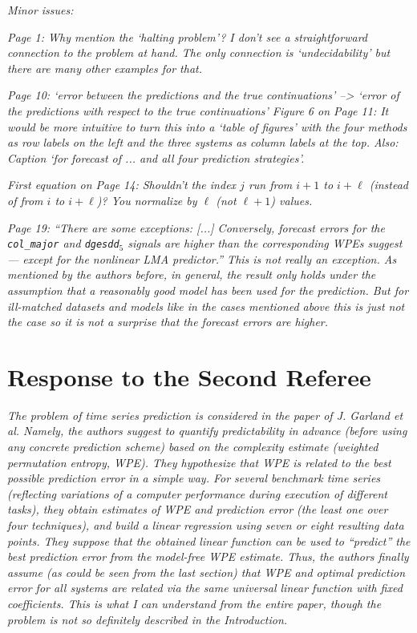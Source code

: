 \documentclass[12pt]{article}
\begin{document}
\noindent\emph{Minor issues:}

\emph{Page 1: Why mention the `halting problem'? I don't see a straightforward
connection to the problem at hand. The only connection is `undecidability' but
there are many other examples for that.}

\emph{Page 10: `error between the predictions and the true continuations' -->
`error of the predictions with respect to the true continuations' Figure 6 on
Page 11: It would be more intuitive to turn this into a `table of figures'
with the four methods as row labels on the left and the three systems as column
labels at the top. Also: Caption `for forecast of ... and all four prediction
strategies'.}

\emph{First equation on Page 14: Shouldn't the index $j$ run from $i+1$ to
$i+\ell$ (instead of from $i$ to $i+\ell$)? You normalize by $\ell$ (not
$\ell+1$) values.}

\emph{Page 19: ``There are some exceptions: [...] Conversely, forecast errors
for the \texttt{col\_major} and \texttt{dgesdd$_5$} signals are higher than the
corresponding WPEs suggest --- except for the nonlinear LMA predictor.'' This is
not really an exception. As mentioned by the authors before, in general, the
result only holds under the assumption that a reasonably good model has been
used for the prediction. But for ill-matched datasets and models like in the
cases mentioned above this is just not the case so it is not a surprise that the
forecast errors are higher.}

\section*{Response to the Second Referee}

\emph{The problem of time series prediction is considered in the paper of J.
Garland et al. Namely, the authors suggest to quantify predictability in advance
(before using any concrete prediction scheme) based on the complexity estimate
(weighted permutation entropy, WPE). They hypothesize that WPE is related to the
best possible prediction error in a simple way. For several benchmark time
series (reflecting variations of a computer performance during execution of
different tasks), they obtain estimates of WPE and prediction error (the least
one over four techniques), and build a linear regression using seven or eight
resulting data points. They suppose that the obtained linear function can be
used to ``predict'' the best prediction error from the model-free WPE estimate.
Thus, the authors finally assume (as could be seen from the last section) that
WPE and optimal prediction error for all systems are related via the same
universal linear function with fixed coefficients. This is what I can understand
from the entire paper, though the problem is not so definitely described in the
Introduction.}
\end{document}
